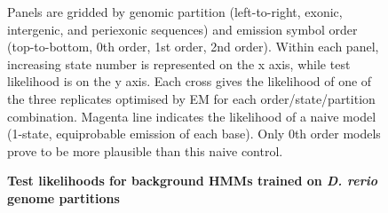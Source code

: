 \documentclass{ut-thesis}
\begin{document}
\begin{NoHyper}
\begin{figure}[!h]
    \caption{{\bf Test likelihoods for background HMMs trained on \textit{D. rerio} genome partitions}}
    Panels are gridded by genomic partition (left-to-right, exonic, intergenic, and periexonic sequences) and emission symbol order (top-to-bottom, 0th order, 1st order, 2nd order). Within each panel, increasing state number is represented on the x axis, while test likelihood is on the y axis. Each cross gives the likelihood of one of the three replicates optimised by EM for each order/state/partition combination. Magenta line indicates the likelihood of a naive model (1-state, equiprobable emission of each base). Only 0th order models prove to be more plausible than this naive control.
    \label{BHMMlh}
\end{figure}


\end{NoHyper}
\end{document}
